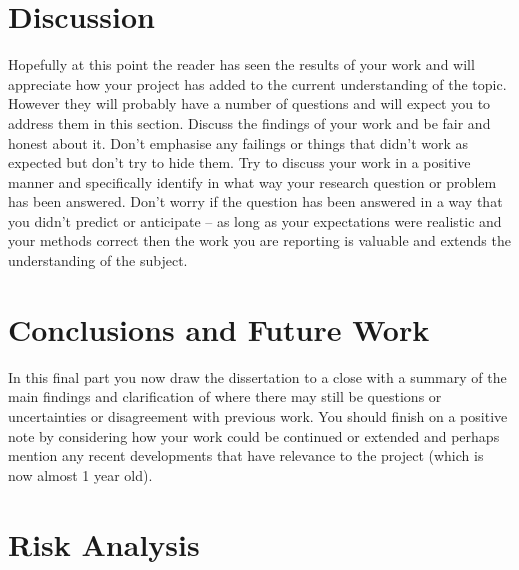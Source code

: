 \documentclass[a4paper, 12pt]{article}
\begin{document}
\section{Discussion} %
Hopefully at this point the reader has seen the results of your work and will appreciate how your project has added to the current understanding of the topic. However they will probably have a number of questions and will expect you to address them in this section. Discuss the findings of your work and be fair and honest about it. Don’t emphasise any failings or things that didn’t work as expected but don’t try to hide them. Try to discuss your work in a positive manner and specifically identify in what way your research question or problem has been answered. Don’t worry if the question has been answered in a way that you didn’t predict or anticipate – as long as your expectations were realistic and your methods correct then the work you are reporting is valuable and extends the understanding of the subject.

\pagebreak


\section{Conclusions and Future Work} %
In this final part you now draw the dissertation to a close with a summary of the main findings and clarification of where there may still be questions or uncertainties or disagreement with previous work. You should finish on a positive note by considering how your work could be continued or extended and perhaps mention any recent developments that have relevance to the project (which is now almost 1 year old).

\pagebreak


\section{Risk Analysis} %


\pagebreak



%
%
%
%
%
%
\end{document}
